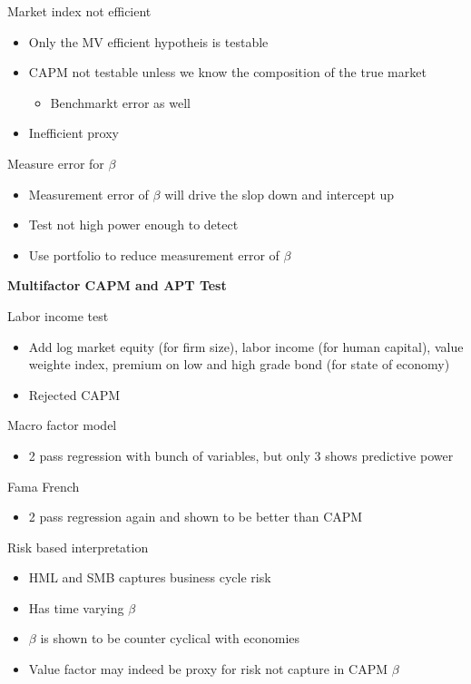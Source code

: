 \documentclass[]{book}
\providecommand{\tightlist}{%
  \setlength{\itemsep}{0pt}\setlength{\parskip}{0pt}}
\theoremstyle{definition}
\theoremstyle{definition}
\theoremstyle{remark}
\begin{document}
Market index not efficient

\begin{itemize}
\tightlist
\item
  Only the MV efficient hypotheis is testable
\item
  CAPM not testable unless we know the composition of the true market

  \begin{itemize}
  \tightlist
  \item
    Benchmarkt error as well
  \end{itemize}
\item
  Inefficient proxy
\end{itemize}

Measure error for \(\beta\)

\begin{itemize}
\tightlist
\item
  Measurement error of \(\beta\) will drive the slop down and intercept
  up
\item
  Test not high power enough to detect
\item
  Use portfolio to reduce measurement error of \(\beta\)
\end{itemize}

\textbf{Multifactor CAPM and APT Test}

Labor income test

\begin{itemize}
\item
  Add log market equity (for firm size), labor income (for human
  capital), value weighte index, premium on low and high grade bond (for
  state of economy)
\item
  Rejected CAPM
\end{itemize}

Macro factor model

\begin{itemize}
\tightlist
\item
  2 pass regression with bunch of variables, but only 3 shows predictive
  power
\end{itemize}

Fama French

\begin{itemize}
\tightlist
\item
  2 pass regression again and shown to be better than CAPM
\end{itemize}

Risk based interpretation

\begin{itemize}
\tightlist
\item
  HML and SMB captures business cycle risk
\item
  Has time varying \(\beta\)
\item
  \(\beta\) is shown to be counter cyclical with economies
\item
  Value factor may indeed be proxy for risk not capture in CAPM
  \(\beta\)
\end{itemize}
\end{document}
